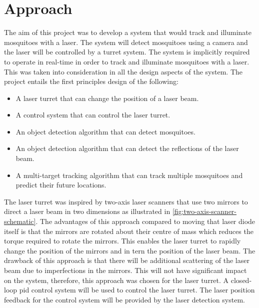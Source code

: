 
\section{Approach}
The aim of this project was to develop a system that would track and  illuminate mosquitoes with a laser. The system will detect mosquitoes using a camera and the laser will be controlled by a turret system. The system is implicitly required to operate in real-time in order to track and illuminate mosquitoes with a laser. This was taken into consideration in all the design aspects of the system. The project entails the first principles design of the following:
\begin{itemize}
      \item A laser turret that can change the position of a laser beam.
      \item A control system that can control the laser turret.
      \item An object detection algorithm that can detect mosquitoes.
      \item An object detection algorithm that can detect the reflections of the laser beam.
      \item A multi-target tracking algorithm that can track multiple mosquitoes and predict their future locations.
\end{itemize}

The laser turret was inspired by two-axis laser scanners that use two mirrors to direct a laser beam in two dimensions as illustrated in \autoref{fig:two-axis-scanner-schematic}. The advantages of this approach compared to moving that laser diode itself is that the mirrors are rotated about their centre of mass which reduces the torque required to rotate the mirrors. This enables the laser turret to rapidly change the position of the mirrors and in tern the position of the laser beam. The drawback of this approach is that there will be additional scattering of the laser beam due to imperfections in the mirrors. This will not have significant impact on the system, therefore, this approach was chosen for the laser turret. A closed-loop \gls{pid} control system will be used to control the laser turret. The laser position feedback for the control system will be provided by the laser detection system.

